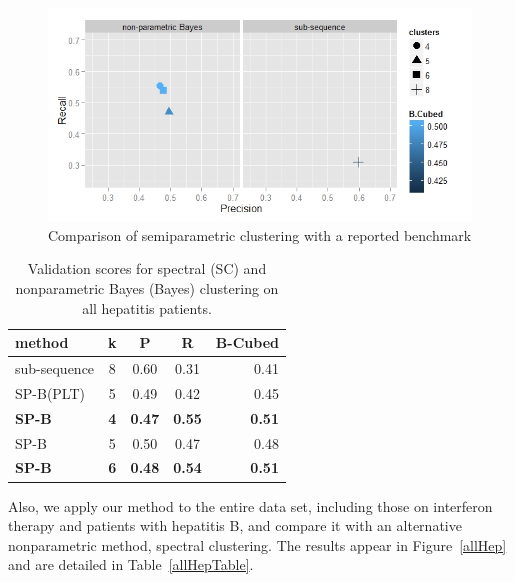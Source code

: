 \begin{figure}[t]
\vskip 0.2in
\begin{center}
\centerline{\includegraphics[width=\columnwidth]{fig/hepC.jpeg}}
\caption{Comparison of semiparametric clustering with a reported benchmark}
\label{hepC}
\end{center}
\vskip -0.2in
\end{figure}

\begin{table}[ht]
\caption{Validation scores for spectral (SC) and nonparametric Bayes (Bayes) clustering on all hepatitis patients.}
\label{scBayestable}
\vskip 0.15in
\begin{center}
\begin{small}
\begin{sc}
\begin{tabular}{lcccr}
\hline
\abovespace\belowspace
method	& k	& P	& R	& B-Cubed \\
\hline
\abovespace
sub-sequence	& 8& 0.60& 0.31& 0.41 \\
SP-B(PLT)		& 5& 0.49& 0.42& 0.45 \\
\textbf{SP-B}	        & \textbf{4}& \textbf{0.47}& \textbf{0.55}& \textbf{0.51 }\\
SP-B	        & 5& 0.50& 0.47& 0.48 \\

\belowspace
\textbf{SP-B}	        &\textbf{ 6}& \textbf{0.48}& \textbf{0.54}& \textbf{0.51} \\
\hline
\end{tabular}
\end{sc}
\end{small}
\end{center}
\vskip -0.1in
\end{table}

Also, we apply our method to the entire data set, including those on interferon therapy and patients with hepatitis B, and compare it with an alternative nonparametric method, spectral clustering.  The results appear in Figure~\ref{allHep} and are detailed in Table~\ref{allHepTable}.

